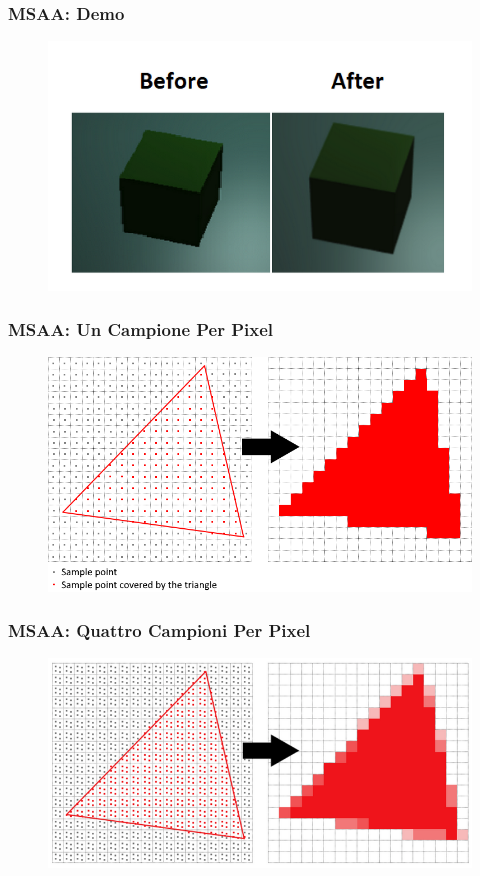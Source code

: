 \begin{frame}
\frametitle{MSAA: Demo}
\begin{figure}[ht]
    \centering
    \includegraphics[scale=0.50]{images/SlidesMSAA/BeforeAfterMSAA.png}
\end{figure}
\end{frame}

\begin{frame}
\frametitle{MSAA: Un Campione Per Pixel}
\begin{figure}[ht]
    \centering
    \includegraphics[scale=0.50]{images/SlidesMSAA/OneSamplePerPixel.png}
\end{figure}
\end{frame}

\begin{frame}
\frametitle{MSAA: Quattro Campioni Per Pixel}
\begin{figure}[ht]
    \centering
    \includegraphics[scale=0.50]{images/SlidesMSAA/FourSamplesPerPixel.png}
\end{figure}
\end{frame}

